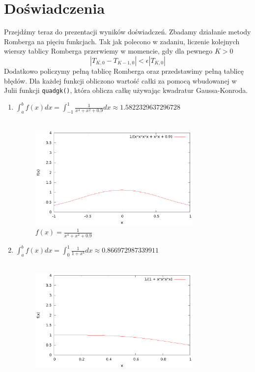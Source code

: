 \documentclass{article}
\begin{document}
\section{Doświadczenia}
Przejdźmy teraz do prezentacji wyników doświadczeń. Zbadamy działanie metody Romberga na pięciu funkcjach.
Tak jak polecono w zadaniu, liczenie kolejnych wierszy tablicy Romberga przerwiemy w momencie, gdy dla pewnego $K > 0$
\begin{equation*}
	|T_{K,0} - T_{K-1,0}| < \epsilon |T_{K,0}|
\end{equation*}
Dodatkowo policzymy pełną tablicę Romberga oraz przedstawimy pełną tablicę błędów.
Dla każdej funkcji obliczono wartość całki za pomocą wbudowanej w Julii funkcji \verb+quadgk()+,
która oblicza całkę
używając kwadratur Gaussa-Konroda.

\begin{enumerate}
	\item $\int_a^b f(x) dx = \int_{-1}^{1} \frac{1}{x^4 + x^2 + 0.9} dx \approx 1.5822329637296728$ \\ \\
	\begin{figure}[H]
		\centering
	    \includegraphics[width=0.8\textwidth]{wykresy/1.eps}
	    \caption{$f(x) = \frac{1}{x^4 + x^2 + 0.9}$}
	\end{figure}
	\item $\int_a^b f(x) dx = \int_0^1 \frac{1}{1 + x^4} dx \approx 0.866972987339911$ \\ \\
	\begin{figure}[H]
		\centering
		\includegraphics[width=0.8\textwidth]{wykresy/2.eps}

\end{figure}
\end{enumerate}
\end{document}
